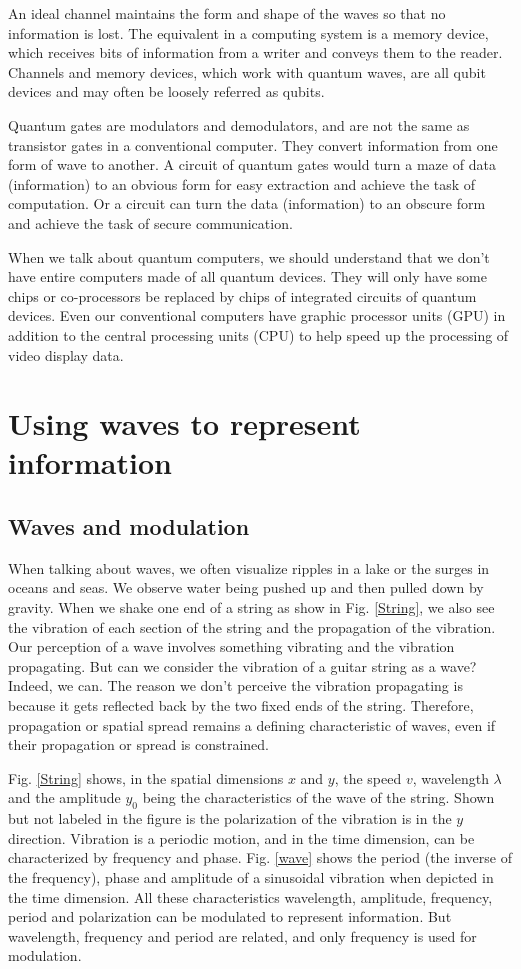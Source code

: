 \documentclass{book}
\begin{document}
An ideal channel maintains the form and shape of the waves so that no information is lost. The equivalent in a computing system is a memory device, which receives bits of information from a writer and conveys them to the reader. Channels and memory devices, which work with quantum waves, are all qubit devices and may often be loosely referred as qubits.

Quantum gates are modulators and demodulators, and are not the same as transistor gates in a conventional computer. They convert information from one form of wave to another. A circuit of quantum gates would turn a maze of data (information) to an obvious form for easy extraction and achieve the task of computation. Or a circuit can turn the data (information) to an obscure form and achieve the task of secure communication.

When we talk about quantum computers, we should understand that we don't have entire computers made of all quantum devices. They will only have some chips or co-processors be replaced by chips of integrated circuits of quantum devices. Even our conventional computers have graphic processor units (GPU) in addition to the central processing units (CPU) to help speed up the processing of video display data.

\chapter{Using waves to represent information}

\section{Waves and modulation}
When talking about waves, we often visualize ripples in a lake or the surges in oceans and seas. We observe water being pushed up and then pulled down by gravity. When we shake one end of a string as show in Fig. \ref{String}, we also see the vibration of each section of the string and the propagation of the vibration. Our perception of a wave involves something vibrating and the vibration propagating. But can we consider the vibration of a guitar string as a wave? Indeed, we can. The reason we don't perceive the vibration propagating is because it gets reflected back by the two fixed ends of the string. Therefore, propagation or spatial spread remains a defining characteristic of waves, even if their propagation or spread is constrained.

Fig. \ref{String} shows, in the spatial dimensions $x$ and $y$, the speed $v$, wavelength $\lambda$ and the amplitude $y_0$ being the characteristics of the wave of the string. Shown but not labeled in the figure is the polarization of the vibration is in the $y$ direction. Vibration is a periodic motion, and in the time dimension, can be characterized by frequency and phase. Fig. \ref{wave} shows the period (the inverse of the frequency), phase and amplitude of a sinusoidal vibration when depicted in the time dimension. All these characteristics wavelength, amplitude, frequency, period and polarization can be modulated to represent information. But wavelength, frequency and period are related, and only frequency is used for modulation.
\end{document}
